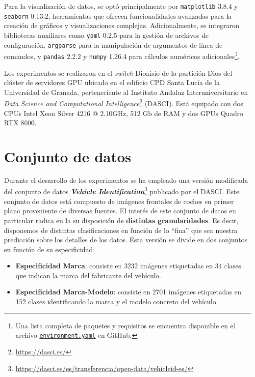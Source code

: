 Para la visualización de datos, se optó principalmente por \texttt{matplotlib} 3.8.4 y \texttt{seaborn} 0.13.2, herramientas que ofrecen funcionalidades avanzadas para la creación de gráficos y visualizaciones complejas. Adicionalmente, se integraron bibliotecas auxiliares como \texttt{yaml} 0.2.5 para la gestión de archivos de configuración, \texttt{argparse} para la manipulación de argumentos de línea de comandos, y \texttt{pandas} 2.2.2 y \texttt{numpy} 1.26.4 para cálculos numéricos adicionales\footnote{Una lista completa de paquetes y requisitos se encuentra disponible en el archivo \href{https://github.com/pab1s/tda-nn-analysis/blob/main/environment.yaml}{\texttt{environment.yaml}} en GitHub.}.

Los experimentos se realizaron en el \textit{switch} Dionisio de la partición Dios del clúster de servidores GPU ubicado en el edificio CPD Santa Lucía de la Universidad de Granada, perteneciente al Instituto Andaluz Interuniversitario en \textit{Data Science and Computational Intelligence}\footnote{\href{https://dasci.es/}{https://dasci.es/}} (DASCI). Está equipado con dos CPUs Intel Xeon Silver 4216 @ 2.10GHz, 512 Gb de RAM y dos GPUs Quadro RTX 8000.

\section{Conjunto de datos}

Durante el desarrollo de los experimentos se ha empleado una versión modificada del conjunto de datos \textbf{\textit{Vehicle Identification}}\footnote{\href{https://dasci.es/es/transferencia/open-data/vehicleid-es/}{https://dasci.es/es/transferencia/open-data/vehicleid-es/}} publicado por el DASCI. Este conjunto de datos está compuesto de imágenes frontales de coches en primer plano proveniente de diversas fuentes. El interés de este conjunto de datos en particular radica en la su disposición de \textbf{distintas granularidades}. Es decir, disponemos de distintas clasificaciones en función de lo \enquote{fina} que sea nuestra predicción sobre los detalles de los datos. Esta versión se divide en dos conjuntos en función de su especificidad:

\begin{itemize}
	\item \textbf{Especificidad Marca}: consiste en 3232 imágenes etiquetadas en 34 clases que indican la marca del fabricante del vehículo.
	\item \textbf{Especificidad Marca-Modelo}: consiste en 2701 imágenes etiquetadas en 152 clases identificando la marca y el modelo concreto del vehículo.
\end{itemize}


